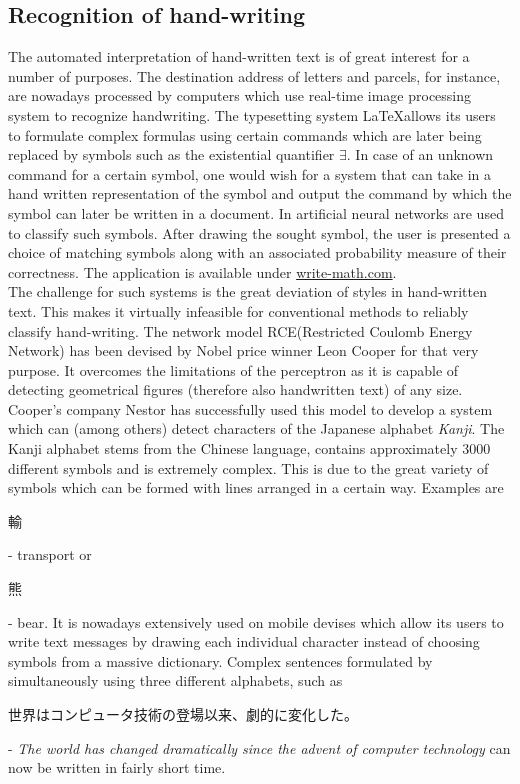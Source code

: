 \documentclass[10pt,a4paper,DIV=11]{scrreprt}
\begin{document}
\subsection{Recognition of hand-writing}
The automated interpretation of hand-written text is of great interest for a number of purposes. The destination address of letters and parcels,
for instance, are nowadays processed by computers which use real-time image processing system to recognize handwriting. The typesetting system 
\LaTeX allows its users to formulate complex formulas using certain commands which are later being replaced by symbols such as the existential 
quantifier $\exists$. In case of an unknown command for a certain symbol, one would wish for a system that can take in a hand written representation 
of the symbol and output the command by which the symbol can later be written in a document. In \cite{MARTIN} artificial neural networks are used 
to classify such symbols. After drawing the sought symbol, the user is presented a choice of matching symbols along with an 
associated probability measure of their correctness. The application is available under \url{write-math.com}.
\\
The challenge for such systems is the great deviation of styles in hand-written text. This makes it virtually infeasible for conventional methods 
to reliably classify hand-writing. The network model RCE(Restricted Coulomb Energy Network) has been devised by Nobel price winner Leon Cooper for 
that very purpose. It overcomes the limitations of the perceptron as it is capable of detecting geometrical figures (therefore also handwritten text) 
of any size. Cooper's company Nestor has successfully used this model to develop a system which can (among others) detect characters of the Japanese alphabet \textit{Kanji}.
The Kanji alphabet stems from the Chinese language, contains approximately 3000 different symbols and is extremely complex. This is due to the great
variety of symbols which can be formed with lines arranged in a certain way. Examples are \begin{CJK}{UTF8}{min}輸\end{CJK} - transport or 
\begin{CJK}{UTF8}{min}熊\end{CJK} - bear. It is nowadays extensively used on mobile devises which allow its users to write text messages by drawing 
each individual character instead of choosing symbols from a massive dictionary. Complex sentences formulated by simultaneously using three different
alphabets, such as \begin{CJK}{UTF8}{min}世界はコンピュータ技術の登場以来、劇的に変化した。\end{CJK} - \textit{The world has changed dramatically 
since the advent of computer technology} can now be written in fairly short time.
\end{document}
